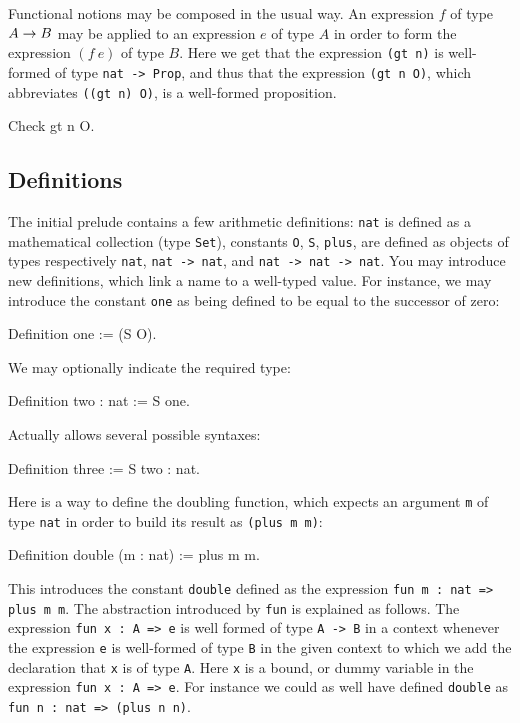 \documentclass[11pt,a4paper]{book}
\begin{document}
Functional notions may be composed in the usual way. An expression $f$
of type $A\rightarrow B$ may be applied to an expression $e$ of type $A$ in order
to form the expression $(f~e)$ of type $B$. Here we get that
the expression \verb:(gt n): is well-formed of type \texttt{nat -> Prop},
and thus that the expression \verb:(gt n O):, which abbreviates
\verb:((gt n) O):, is a well-formed proposition.
\begin{coq_example}
Check gt n O.
\end{coq_example}

\subsection{Definitions}

The initial prelude contains a few arithmetic definitions:
\texttt{nat} is defined as a mathematical collection (type \texttt{Set}),
constants \texttt{O}, \texttt{S}, \texttt{plus}, are defined as objects of
types respectively \texttt{nat}, \texttt{nat -> nat}, and \texttt{nat ->
nat -> nat}.
You may introduce new definitions, which link a name to a well-typed value.
For instance, we may introduce the constant \texttt{one} as being defined
to be equal to the successor of zero:
\begin{coq_example}
Definition one := (S O).
\end{coq_example}
We may optionally indicate the required type:
\begin{coq_example}
Definition two : nat := S one.
\end{coq_example}

Actually \Coq{} allows several possible syntaxes:
\begin{coq_example}
Definition three := S two : nat.
\end{coq_example}

Here is a way to define the doubling function, which expects an
argument \verb:m: of type \verb:nat: in order to build its result as
\verb:(plus m m)::

\begin{coq_example}
Definition double (m : nat) := plus m m.
\end{coq_example}
This introduces the constant \texttt{double} defined as the
expression \texttt{fun m : nat => plus m m}.
The abstraction introduced by \texttt{fun} is explained as follows.
The expression \texttt{fun x : A => e} is well formed of type
\texttt{A -> B} in a context whenever the expression \texttt{e} is
well-formed of type \texttt{B} in the given context to which we add the
declaration that \texttt{x} is of type \texttt{A}. Here \texttt{x} is a
bound, or dummy variable in the expression \texttt{fun x : A => e}.
For instance we could as well have defined \texttt{double} as
\texttt{fun n : nat => (plus n n)}.
\end{document}
